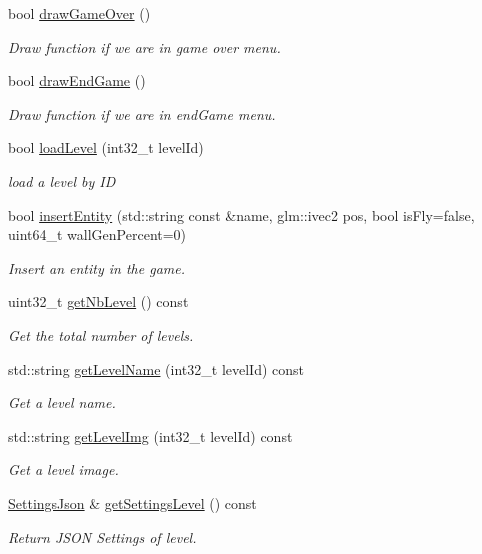 \begin{DoxyCompactItemize}
bool \hyperlink{class_scene_game_a5fef0afce5075031148f849b067dfe0a}{draw\+Game\+Over} ()
\begin{DoxyCompactList}\small\item\em Draw function if we are in game over menu. \end{DoxyCompactList}\item 
bool \hyperlink{class_scene_game_a128672ac2376a82f99b4a22fb759c368}{draw\+End\+Game} ()
\begin{DoxyCompactList}\small\item\em Draw function if we are in end\+Game menu. \end{DoxyCompactList}\item 
bool \hyperlink{class_scene_game_a1cafe2063efb8abce412fe86888f5c51}{load\+Level} (int32\+\_\+t level\+Id)
\begin{DoxyCompactList}\small\item\em load a level by ID \end{DoxyCompactList}\item 
bool \hyperlink{class_scene_game_a51c64858cec30552b4eed160c9296a94}{insert\+Entity} (std\+::string const \&name, glm\+::ivec2 pos, bool is\+Fly=false, uint64\+\_\+t wall\+Gen\+Percent=0)
\begin{DoxyCompactList}\small\item\em Insert an entity in the game. \end{DoxyCompactList}\item 
uint32\+\_\+t \hyperlink{class_scene_game_a49b0881897a0e7dca907a694ecce8c92}{get\+Nb\+Level} () const
\begin{DoxyCompactList}\small\item\em Get the total number of levels. \end{DoxyCompactList}\item 
std\+::string \hyperlink{class_scene_game_a29ee8ee172dcd5b70385f29f39e769bc}{get\+Level\+Name} (int32\+\_\+t level\+Id) const
\begin{DoxyCompactList}\small\item\em Get a level name. \end{DoxyCompactList}\item 
std\+::string \hyperlink{class_scene_game_adbaa88f6ec0f3e093474e8d293b65282}{get\+Level\+Img} (int32\+\_\+t level\+Id) const
\begin{DoxyCompactList}\small\item\em Get a level image. \end{DoxyCompactList}\item 
\hyperlink{class_settings_json}{Settings\+Json} \& \hyperlink{class_scene_game_aafa85a3148ac0886a2e6dfe1ee5a3d99}{get\+Settings\+Level} () const
\begin{DoxyCompactList}\small\item\em Return J\+S\+ON Settings of level. \end{DoxyCompactList}\end{DoxyCompactItemize}
